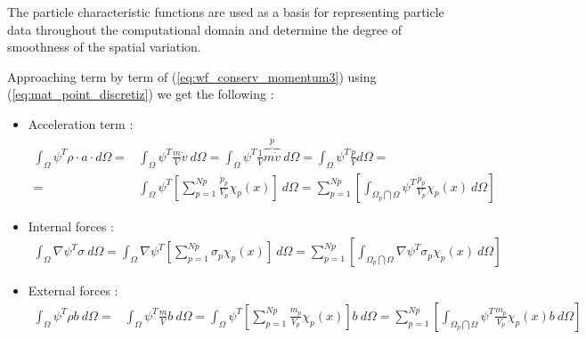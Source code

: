 \message{ !name(../../../mpm.tex)}\documentclass[10pt,a4paper]{article}
\begin{document}
The particle characteristic functions are used as a basis for
representing particle data throughout the computational domain and
determine the degree of smoothness of the spatial variation.

Approaching term by term of (\ref{eq:wf_conserv_momentum3}) using
(\ref{eq:mat_point_discretiz}) we get the following :



\begin{itemize}
\item Acceleration term :
  \begin{eqnarray}
    \label{eq:wf_conserv_momentum_acc}
   \int_{\Omega} \psi^T \rho \cdot a \cdot d\Omega =& \int_{\Omega} \psi^T \frac{m}{V}
                                                     \dot{v}\ d\Omega = \int_{\Omega} \psi^T \frac{1}{V}
                                                     \overbrace{m\dot{v}}^{\dot{p}}\ d\Omega = \int_{\Omega} \psi^T \frac{\dot{p}}{V} d\Omega = \nonumber \\
  =&  \int_{\Omega} \psi^T \left[ \sum^{Np}_{p=1} \frac{\dot{p}_p}{V_p} \chi_p(x) \right]\ d\Omega =
     \sum^{Np}_{p=1} \left[ \int_{\Omega_p \bigcap \Omega}
     \psi^T\frac{\dot{p}_p}{V_p}\chi_p(x)\ d\Omega \right] 
  \end{eqnarray}


\item Internal forces :
  \begin{align}
    \label{eq:wf_conserv_momentum_int_forces}
    \int_{\Omega}  \nabla \psi^T \sigma\ d\Omega = \int_{\Omega}  \nabla
    \psi^T \left[\sum^{Np}_{p=1} \sigma_p \chi_p(x) \right]\ d\Omega =
    \sum^{Np}_{p=1} \left[ \int_{\Omega_p \bigcap \Omega}
    \nabla\psi^T\sigma_p\chi_p(x)\ d\Omega \right]
  \end{align}
\item External forces :
  \begin{align}
    \label{eq:wf_conserv_momentum_ext_forces}
    \int_{\Omega} \psi^T \rho b\ d\Omega =& \int_{\Omega} \psi^T \frac{m}{V} b\
                                           d\Omega = \int_{\Omega} \psi^T \left[ \sum^{Np}_{p=1}
                                           \frac{m_p}{V_p}\chi_p(x) \right] b\ d\Omega = \sum_{p=1}^{Np}
                                           \left[ \int_{\Omega_p \bigcap \Omega}
                                           \psi^T \frac{m_p}{V_p} \chi_p(x) b\ d\Omega \right]
  \end{align}  
\end{itemize}
\end{document}
